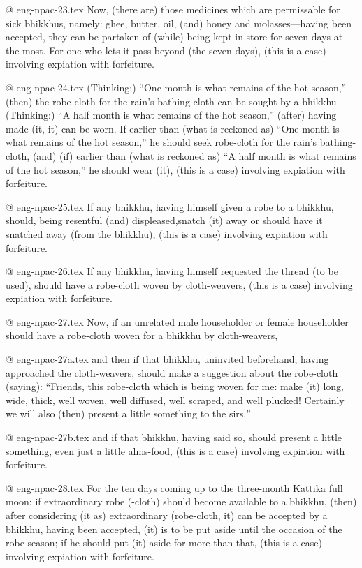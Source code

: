 @ eng-npac-23.tex
Now, (there are) those medicines which are permissable for sick bhikkhus, namely: ghee, butter, oil, (and) honey and molasses—having been accepted, they can be partaken of (while) being kept in store for seven days at the most. For one who lets it pass beyond (the seven days), (this is a case) involving expiation with forfeiture.

@ eng-npac-24.tex
(Thinking:) “One month is what remains of the hot season,” (then) the robe-cloth for the rain's bathing-cloth can be sought by a bhikkhu. (Thinking:) “A half month is what remains of the hot season,” (after) having made (it, it) can be worn. If earlier than (what is reckoned as) “One month is what remains of the hot season,” he should seek robe-cloth for the rain's bathing-cloth, (and) (if) earlier than (what is reckoned as) “A half month is what remains of the hot season,” he should wear (it), (this is a case) involving expiation with forfeiture.

@ eng-npac-25.tex
If any bhikkhu, having himself given a robe to a bhikkhu, should, being resentful (and) displeased,snatch (it) away or should have it snatched away (from the bhikkhu), (this is a case) involving expiation with forfeiture.

@ eng-npac-26.tex
If any bhikkhu, having himself requested the thread (to be used), should have a robe-cloth woven by cloth-weavers, (this is a case) involving expiation with forfeiture.

@ eng-npac-27.tex
Now, if an unrelated male householder or female householder should have a robe-cloth woven for a bhikkhu by cloth-weavers,

@ eng-npac-27a.tex
and then if that bhikkhu, uninvited beforehand, having approached the cloth-weavers, should make a suggestion about the robe-cloth (saying): “Friends, this robe-cloth which is being woven for me: make (it) long, wide, thick, well woven, well diffused, well scraped, and well plucked! Certainly we will also (then) present a little something to the sirs,” 

@ eng-npac-27b.tex
and if that bhikkhu, having said so, should present a little something, even just a little alms-food, (this is a case) involving expiation with forfeiture.

@ eng-npac-28.tex
For the ten days coming up to the three-month Kattikā full moon: if extraordinary robe (-cloth) should become available to a bhikkhu, (then) after considering (it as) extraordinary (robe-cloth, it) can be accepted by a bhikkhu, having been accepted, (it) is to be put aside until the occasion of the robe-season; if he should put (it) aside for more than that, (this is a case) involving expiation with forfeiture.

